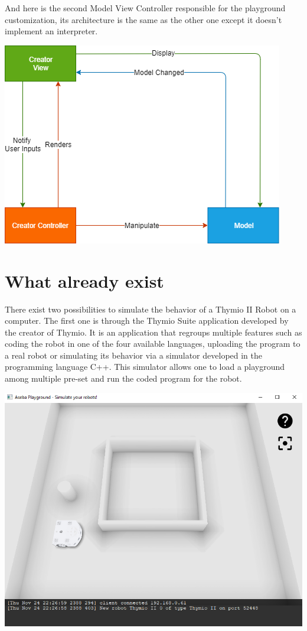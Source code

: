 \documentclass{scrbook}
\begin{document}
And here is the second Model View Controller responsible for the playground customization, its architecture is the same as the other one except it doesn't implement an interpreter.
\begin{center}
  \includegraphics[width=\textwidth]{./architecture_proposal-Page-2}
\end{center}

\chapter{What already exist} 

There exist two possibilities to simulate the behavior of a Thymio II Robot on a computer. 
The first one is through the Thymio Suite application developed by the creator of Thymio. 
It is an application that regroups multiple features such as coding the robot in one of the four available languages, 
uploading the program to a real robot or simulating its behavior via a simulator developed in the programming language C++. 
This simulator allows one to load a playground among multiple pre-set and run the coded program for the robot.

\begin{center}
  \includegraphics[width=\textwidth]{./suite_simulator}
\end{center}
\end{document}
